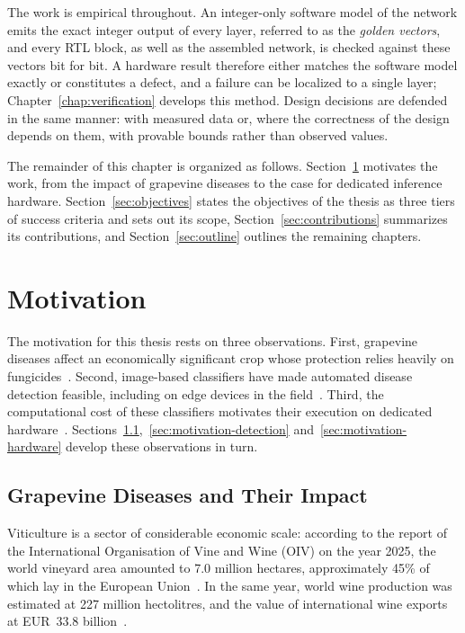 The work is empirical throughout. An integer-only software model of the
network emits the exact integer output of every layer, referred to as the
\emph{golden vectors}, and every RTL block, as well as the assembled network,
is checked against these vectors bit for bit. A hardware result therefore
either matches the software model exactly or constitutes a defect, and a
failure can be localized to a single layer; Chapter~\ref{chap:verification}
develops this method. Design decisions are defended in the same manner: with
measured data or, where the correctness of the design depends on them, with
provable bounds rather than observed values.

The remainder of this chapter is organized as follows.
Section~\ref{sec:motivation} motivates the work, from the impact of grapevine
diseases to the case for dedicated inference hardware.
Section~\ref{sec:objectives} states the objectives of the thesis as three tiers
of success criteria and sets out its scope, Section~\ref{sec:contributions}
summarizes its contributions, and Section~\ref{sec:outline} outlines the
remaining chapters.


\section{Motivation}
\label{sec:motivation}

The motivation for this thesis rests on three observations. First, grapevine
diseases affect an economically significant crop whose protection relies
heavily on fungicides~\cite{oiv2026state,eurostat2007ppp}. Second,
image-based classifiers have made automated disease detection feasible,
including on edge devices in the
field~\cite{mohanty2016plantdisease,morellos2024iot}. Third, the computational
cost of these classifiers motivates their execution on dedicated
hardware~\cite{bai2018dwsep,guo2019survey}.
Sections~\ref{sec:motivation-diseases},~\ref{sec:motivation-detection}
and~\ref{sec:motivation-hardware} develop these observations in turn.


\subsection{Grapevine Diseases and Their Impact}
\label{sec:motivation-diseases}

Viticulture is a sector of considerable economic scale: according to the
report of the International Organisation of Vine and Wine (OIV) on the year
2025, the world vineyard area amounted to 7.0 million hectares, approximately
45\% of which lay in the European Union~\cite{oiv2026state}. In the same year,
world wine production was estimated at 227 million hectolitres, and the value
of international wine exports at EUR~33.8 billion~\cite{oiv2026state}.

